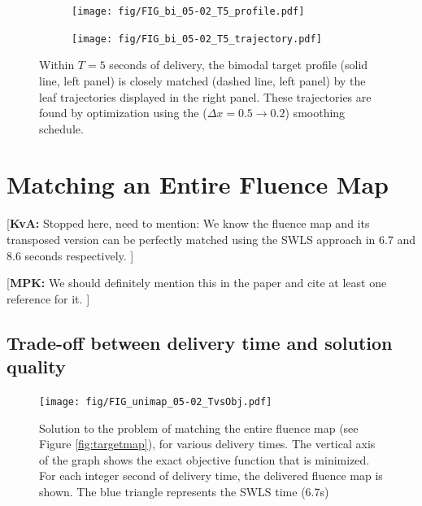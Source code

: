 \documentclass{iopart}
\newcommand{\MPKcomment}[1]{{\color{magenta}\par {[{\bf MPK: } { #1}} ] \\    }}
\newcommand{\KvAcomment}[1]{{\color{magenta}\par {[{\bf KvA: } { #1}} ] \\    }}
\begin{document}
\begin{figure}[h]
  \centering
  \begin{subfigure}[b]{0.5\linewidth}
    \centering\texttt{[image: fig/FIG\_bi\_05-02\_T5\_profile.pdf]}
    \caption{\label{fig:sps_bmt_prof}}
  \end{subfigure}%
  \begin{subfigure}[b]{0.5\linewidth}
    \centering\texttt{[image: fig/FIG\_bi\_05-02\_T5\_trajectory.pdf]}
    \caption{\label{fig:sps_bmt_traj}}
  \end{subfigure}
  \caption{Within $T=5$ seconds of delivery, the bimodal target profile (solid line, left panel) is closely matched (dashed line, left panel) by the leaf trajectories displayed in the right panel. These trajectories are found by optimization using the ($\Delta x = 0.5 \to 0.2$) smoothing schedule.}
  \label{fig:smoothingParamSweep_bimodalTraj}
\end{figure}

\section{Matching an Entire Fluence Map}
\KvAcomment{Stopped here, need to mention:
We know the fluence map and its transposed version can be perfectly matched using the SWLS approach in 6.7 and 8.6 seconds respectively.}
\MPKcomment{We should definitely mention this in the paper and cite at least one reference for it. }


\subsection{Trade-off between delivery time and solution quality}
\begin{figure}
  \centering
  \texttt{[image: fig/FIG\_unimap\_05-02\_TvsObj.pdf]}
  \caption{Solution to the problem of matching the entire fluence map (see Figure \ref{fig:targetmap}), for various delivery times. The vertical axis of the graph shows the exact objective function that is minimized. For each integer second of delivery time, the delivered fluence map is shown. The blue triangle represents the SWLS time (6.7s)}
  \label{fig:TvsObj_bestalpha_uni}
\end{figure}
\end{document}
